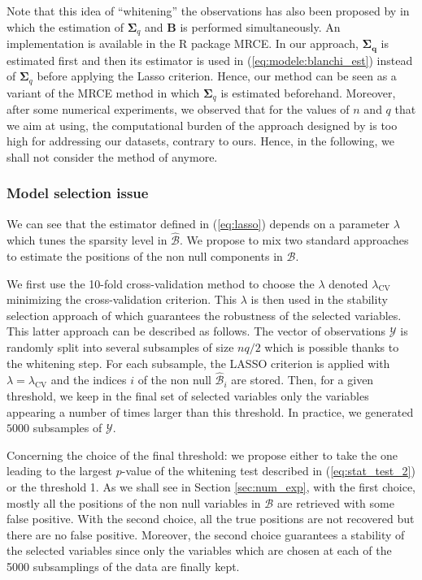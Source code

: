 Note that this idea of ``whitening'' the observations
has also been proposed by \cite{rothman:2010} in which the estimation of $\boldsymbol{\Sigma}_q$ and $\boldsymbol{B}$
is performed simultaneously. An implementation is available in the R package \textsf{MRCE}.
In our approach, $\boldsymbol{\Sigma_q}$ is estimated first and then
its estimator is used in (\ref{eq:modele:blanchi_est}) instead of 
$\boldsymbol{\Sigma}_q$ before applying the Lasso criterion. Hence, our method can be seen as a variant of the MRCE method
in which $\boldsymbol{\Sigma}_q$ is estimated beforehand. Moreover,
after some numerical experiments, we observed that for the values of
$n$ and $q$ that we aim at using, the computational
  burden of the approach designed by \cite{rothman:2010} is too high
  for addressing our datasets, contrary to ours. Hence, in the following, we shall
not consider the method of \cite{rothman:2010} anymore. 

\subsubsection{Model selection issue}\label{sec:model_selection}

We can see that the estimator defined in (\ref{eq:lasso})
depends on a parameter $\lambda$ which tunes the sparsity level in $\widehat{\mathcal{B}}$. We propose to mix two standard
approaches to estimate the positions of the non null components in $\mathcal{B}$. 

We first use the  10-fold cross-validation method to choose
the $\lambda$ denoted $\lambda_{\textrm{CV}}$ minimizing the
cross-validation criterion.
This $\lambda$ is then used in the stability selection approach of
\cite{meinshausen:buhlmann:2010} which guarantees the robustness of the selected variables. This latter approach
can be described as follows.
The vector of observations $\mathcal{Y}$ is randomly split into
several subsamples of size $nq/2$ which is possible
  thanks to the whitening step.
For each subsample, the LASSO criterion is applied with $\lambda=\lambda_{\textrm{CV}}$
and the indices $i$ of the non null $\widehat{\mathcal{B}}_i$ are stored. 
Then, for a given threshold, we keep in the final
set of selected variables only the variables appearing a number of times larger than this threshold. 
In practice, we generated $5000$ subsamples of
$\mathcal{Y}$. 

Concerning the choice of the final threshold: we
propose either to take the one leading to the largest $p$-value of the
whitening test described in (\ref{eq:stat_test_2}) or the threshold 1. As we
shall see in Section \ref{sec:num_exp}, with
the first choice, mostly all the positions of the non null variables
in $\mathcal{B}$ are retrieved with some false positive. With the
second choice, all the true positions are
not recovered but there are no false positive. Moreover, the second choice guarantees a stability of the selected variables since
only the variables which are chosen at each of the 5000 subsamplings of the data are finally kept.



